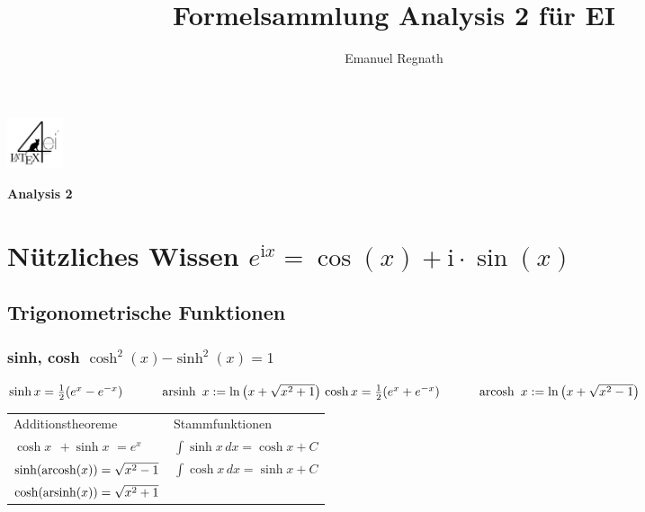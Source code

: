 \documentclass[6pt,a4paper]{scrartcl}
\title{Formelsammlung Analysis 2 für EI}
\author{Emanuel Regnath}
\renewcommand{\emph}[1]{\textbf{#1}}                                                            %
\newcommand{\bs}[1]{\ensuremath{\boldsymbol{#1}}}                              %
\renewcommand{\i}{\ensuremath{\mathrm{i}}}                                     %
\begin{document}
\begin{multicols*}{4}
    \parbox{2.3cm}{
        \includegraphics[height=1.5cm]{./img/Logo.pdf}
    }
    \parbox{4cm}{
        \emph{\Large{Analysis 2}}
    }
    \vspace{-2mm} %

    \section{Nützliches Wissen $e^{\i x} = \cos (x) + \i \cdot \sin(x)$}
    \subsection{Trigonometrische Funktionen}
    \subsubsection{sinh, cosh \quad $\cosh^2(x)  \bs - \sinh^2(x) = 1$}
    $\sinh x = \frac{1}{2}(e^x -e^{-x}) \qquad \quad \operatorname{arsinh}\ x:= \ln\left(x+\sqrt{x^2+1}\right) \\
        \cosh x  = \frac{1}{2}(e^x +e^{-x}) \qquad \quad \operatorname{arcosh}\ x:= \ln\left(x+\sqrt{x^2-1}\right)\\
    $\\
    \begin{tabular}{ll}
        Additionstheoreme                         & Stammfunktionen                     \\
        $\cosh x \,\; + \sinh x \,\,= e^{x}$      & $\int \sinh x \, dx = \cosh x + C$  \\
        $\sinh({\rm arcosh}(x)) = \sqrt{x^2 - 1}$ & $\int \cosh x \, dx = \sinh x + C $ \\
        $\cosh({\rm arsinh}(x)) = \sqrt{x^2 + 1}$                                       \\
    \end{tabular}


\end{multicols*}
\end{document}
